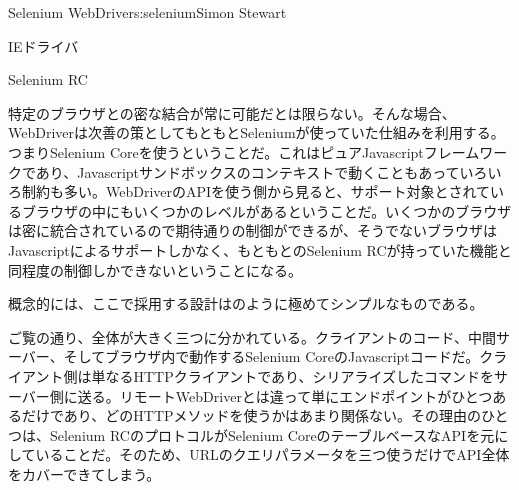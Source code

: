 \begin{aosachapter}{Selenium WebDriver}{s:selenium}{Simon Stewart}
\begin{aosasect1}{IEドライバ}
\end{aosasect1}

\begin{aosasect1}{Selenium RC}

特定のブラウザとの密な結合が常に可能だとは限らない。そんな場合、WebDriverは次善の策としてもともとSeleniumが使っていた仕組みを利用する。つまりSelenium Coreを使うということだ。これはピュアJavascriptフレームワークであり、Javascriptサンドボックスのコンテキストで動くこともあっていろいろ制約も多い。WebDriverのAPIを使う側から見ると、サポート対象とされているブラウザの中にもいくつかのレベルがあるということだ。いくつかのブラウザは密に統合されているので期待通りの制御ができるが、そうでないブラウザはJavascriptによるサポートしかなく、もともとのSelenium RCが持っていた機能と同程度の制御しかできないということになる。

概念的には、ここで採用する設計はのように極めてシンプルなものである。


ご覧の通り、全体が大きく三つに分かれている。クライアントのコード、中間サーバー、そしてブラウザ内で動作するSelenium CoreのJavascriptコードだ。クライアント側は単なるHTTPクライアントであり、シリアライズしたコマンドをサーバー側に送る。リモートWebDriverとは違って単にエンドポイントがひとつあるだけであり、どのHTTPメソッドを使うかはあまり関係ない。その理由のひとつは、Selenium RCのプロトコルがSelenium CoreのテーブルベースなAPIを元にしていることだ。そのため、URLのクエリパラメータを三つ使うだけでAPI全体をカバーできてしまう。


\end{aosasect1}
\end{aosachapter}
